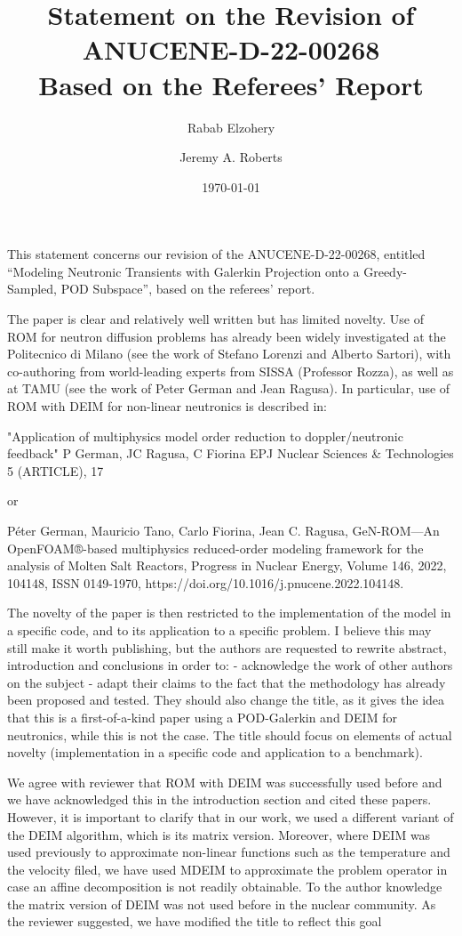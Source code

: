\documentclass[10pt]{article}
\title{Statement on the Revision of ANUCENE-D-22-00268 \\
  Based on the Referees' Report}
\author{Rabab Elzohery \and Jeremy A. Roberts}
\date{\today}
\begin{document}
This statement concerns our revision of the ANUCENE-D-22-00268, entitled ``Modeling Neutronic Transients with Galerkin Projection onto a Greedy-Sampled, POD Subspace'', based on the referees' report.


\begin{response}{
   The paper is clear and relatively well written but has limited novelty. Use of ROM for neutron diffusion problems has already been widely investigated at the Politecnico di Milano (see the work of Stefano Lorenzi and Alberto Sartori), with co-authoring from world-leading experts from SISSA (Professor Rozza), as well as at TAMU (see the work of Peter German and Jean Ragusa). In particular, use of ROM with DEIM for non-linear neutronics is described in:
  
  "Application of multiphysics model order reduction to doppler/neutronic feedback"
  P German, JC Ragusa, C Fiorina
  EPJ Nuclear Sciences \& Technologies 5 (ARTICLE), 17
  
  or
  
  Péter German, Mauricio Tano, Carlo Fiorina, Jean C. Ragusa,
  GeN-ROM—An OpenFOAM®-based multiphysics reduced-order modeling framework for the analysis of Molten Salt Reactors,
  Progress in Nuclear Energy,
  Volume 146,
  2022,
  104148,
  ISSN 0149-1970,
  https://doi.org/10.1016/j.pnucene.2022.104148.
  
  The novelty of the paper is then restricted to the implementation of the model in a specific code, and to its application to a specific problem. I believe this may still make it worth publishing, but the authors are requested to rewrite abstract, introduction and conclusions in order to:
  - acknowledge the work of other authors on the subject
  - adapt their claims to the fact that the methodology has already been proposed and tested.
  They should also change the title, as it gives the idea that this is a first-of-a-kind paper using a POD-Galerkin and DEIM for neutronics, while this is not the case. The title should focus on elements of actual novelty (implementation in a specific code and application to a benchmark).}

We agree with reviewer that ROM with DEIM was successfully used before and we have acknowledged this in the introduction section and cited these papers.
However, it is important to clarify that in our work, we used a different variant of the DEIM algorithm, which is its matrix version.
Moreover, where DEIM was used previously to approximate non-linear functions such as the temperature and the velocity filed, we have used MDEIM to approximate the problem operator in case an affine decomposition is not readily obtainable. To the author knowledge the matrix version of DEIM was not used before in the nuclear community.
As the reviewer suggested, we have modified the title to reflect this goal
\end{response}
\end{document}

